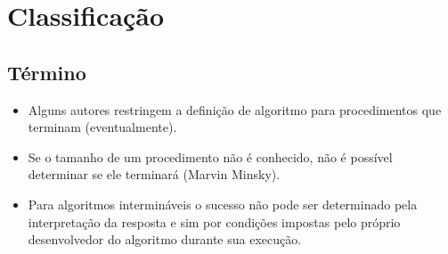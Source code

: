 \section{Classificação}%
\subsection{Término}%
\begin{frame}[label=main]
	\begin{itemize}
		\item Alguns autores restringem a definição de algoritmo para 
		procedimentos que terminam (eventualmente).
		\pause\vfill
		\item Se o tamanho de um procedimento não é conhecido, não é possível 
		determinar se ele terminará (Marvin Minsky).
		\pause\vfill
		\item Para algoritmos intermináveis o sucesso não pode ser determinado 
		pela interpretação da resposta e sim por condições impostas pelo próprio
		desenvolvedor do algoritmo durante sua execução.
	\end{itemize}
\end{frame}

